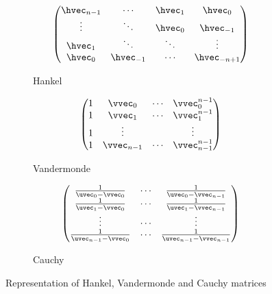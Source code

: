 \begin{figure}[t]
   \centering
   \begin{subfigure}[b]{0.32\textwidth}
       \centering
       \begin{equation*}
	  \leftmatrix
	     \hvec_{n-1} & \cdots     & \hvec_1 & \hvec_0      \\
	     \vdots      & \ddots     & \hvec_0 & \hvec_{-1}   \\
	     \hvec_1     & \ddots     & \ddots  & \vdots       \\
	     \hvec_0     & \hvec_{-1} & \cdots  & \hvec_{-n+1} \\
	  \rightmatrix
       \end{equation*}
       \caption*{Hankel}
   \end{subfigure}
   \hfill
   \begin{subfigure}[b]{0.32\textwidth}
       \centering
       \begin{equation*}
	  \leftmatrix
	    1 & \vvec_0     & \cdots & \vvec_0^{n-1} \\
	    1 & \vvec_1     & \cdots & \vvec_1^{n-1} \\
	    1 & \vdots      &        & \vdots        \\
	    1 & \vvec_{n-1} & \cdots & \vvec_{n-1}^{n-1}
	  \rightmatrix
       \end{equation*}
       \caption*{Vandermonde}
   \end{subfigure}
   \hfill
   \begin{subfigure}[b]{0.32\textwidth}
       \centering
       \begin{equation*}
	  \leftmatrix
	  \frac{1}{\uvec_0 - \vvec_{0}}     & \cdots & \frac{1}{\uvec_0 - \vvec_{n-1}} \\
	  \frac{1}{\uvec_1 - \vvec_{0}}     & \cdots & \frac{1}{\uvec_1 - \vvec_{n-1}} \\
	  \vdots                            & \cdots & \vdots                          \\
	  \frac{1}{\uvec_{n-1} - \vvec_{0}} & \cdots & \frac{1}{\uvec_{n-1} - \vvec_{n-1}}
	  \rightmatrix
       \end{equation*}
       \caption*{Cauchy}
   \end{subfigure}
   \caption{Representation of Hankel, Vandermonde and Cauchy matrices}
  \label{figure:ch2-example_structure_matrices}
\end{figure}



